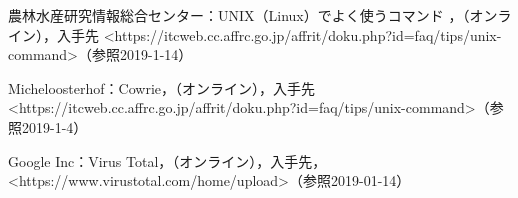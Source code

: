 \begin{thebibliography}{30}
       農林水産研究情報総合センター：UNIX（Linux）でよく使うコマンド ，（オンライン），入手先 \textless https:\slash\slash{}itcweb.cc.affrc.go.jp\slash{}affrit/doku.php?id=faq\slash{}tips\slash{}unix-command\textgreater（参照2019-1-14）
    
        Micheloosterhof：Cowrie，（オンライン），入手先 \textless https:\slash\slash{}itcweb.cc.affrc.go.jp\slash{}affrit\slash{}doku.php?id=faq\slash{}tips/unix-command\textgreater（参照2019-1-4）
    
        Google Inc：Virus Total，（オンライン），入手先，\textless https:\slash\slash{}www.virustotal.com\slash{}home\slash{}upload\textgreater（参照2019-01-14）
\end{thebibliography}
